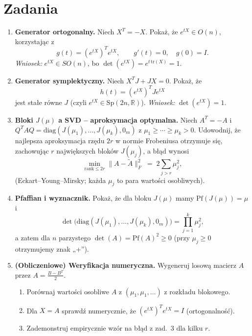 \documentclass[12pt]{article}
\theoremstyle{plain}
\theoremstyle{remark}
\newcommand{\R}{\mathbb{R}}
\begin{document}
\section*{Zadania}

\begin{enumerate}[itemsep=4pt]

  \item \textbf{Generator ortogonalny.}
  Niech $X^T=-X$. Pokaż, że $e^{tX}\in O(n)$, korzystając z
  \[
  g(t)=(e^{tX})^T e^{tX},\qquad g'(t)=0,\quad g(0)=I.
  \]
  \emph{Wniosek:} $e^{tX}\in SO(n)$, bo $\det(e^{tX})=e^{t\,\mathrm{tr}(X)}=1$.

  \item \textbf{Generator symplektyczny.}
  Niech $X^T J + J X=0$. Pokaż, że
  \[
  h(t)=(e^{tX})^T J e^{tX}
  \]
  jest stałe równe $J$ (czyli $e^{tX}\in \mathrm{Sp}(2n,\R)$). \emph{Wniosek:} $\det(e^{tX})=1$.

  \item \textbf{Bloki $J(\mu)$ a SVD – aproksymacja optymalna.}
  Niech $A^T=-A$ i $Q^TAQ=\mathrm{diag}(J(\mu_1),\dots,J(\mu_k),0_m)$ z $\mu_1\ge\cdots\ge\mu_k>0$.
  Udowodnij, że najlepsza aproksymacja rzędu $2r$ w normie Frobeniusa otrzymuje się,
  zachowując $r$ największych bloków $J(\mu_j)$, a błąd wynosi
  \[
  \min_{\mathrm{rank}\le 2r}\|A-\tilde A\|_F^2
  \;=\; 2\sum_{j>r}\mu_j^2,
  \]
  (Eckart–Young–Mirsky; każda $\mu_j$ to para wartości osobliwych).

  \item \textbf{Pfaffian i wyznacznik.}
  Pokaż, że dla bloku $J(\mu)$ mamy $\mathrm{Pf}(J(\mu))=\mu$ i
  \[
  \det\!\big(\mathrm{diag}(J(\mu_1),\dots,J(\mu_k),0_m)\big)
  = \prod_{j=1}^k \mu_j^2,
  \]
  a zatem dla $n$ parzystego $\det(A)=\mathrm{Pf}(A)^2\ge 0$ (przy $\mu_j\ge 0$ otrzymujemy znak „+”).

  
  \item \textbf{(Obliczeniowe) Weryfikacja numeryczna.}
  Wygeneruj losową macierz $A$ przez $A=\tfrac{B-B^T}{2}$.
  \begin{enumerate}[label=(\alph*),itemsep=2pt]
    \item Porównaj wartości osobliwe $A$ z $(\mu_1,\mu_1,\dots)$ z rozkładu blokowego.
    \item Dla $X=A$ sprawdź numerycznie, że $(e^{tX})^T e^{tX}=I$ (ortogonalność).
    \item Zademonstruj empirycznie wzór na błąd z zad.\ 3 dla kilku $r$.
  \end{enumerate}

\end{enumerate}
\end{document}
